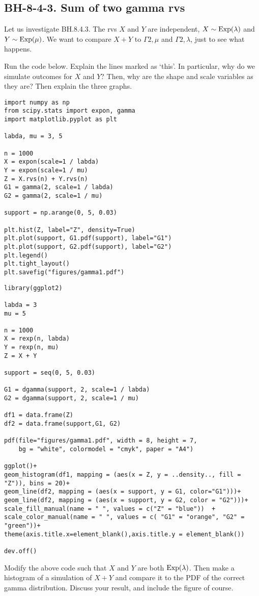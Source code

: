 \subsection{BH-8-4-3. Sum of two gamma rvs}
\label{sec:sum-two-gamma}

Let us investigate BH.8.4.3. The rvs $X$ and $Y$ are independent, $X\sim\mathrm{Exp}(\lambda)$ and $Y\sim\mathrm{Exp}(\mu)$. We want to compare $X+Y$ to $\Gamma{2, \mu}$ and $\Gamma{2, \lambda}$, just to see what happens.

\begin{exercise}
Run the  code below. Explain the lines marked as `this'. In particular, why do we simulate outcomes for $X$ and $Y$? Then, why are the shape and scale variables as they are? Then explain the three graphs.
\begin{verbatim}
import numpy as np
from scipy.stats import expon, gamma
import matplotlib.pyplot as plt

labda, mu = 3, 5

n = 1000
X = expon(scale=1 / labda)
Y = expon(scale=1 / mu)
Z = X.rvs(n) + Y.rvs(n)
G1 = gamma(2, scale=1 / labda)
G2 = gamma(2, scale=1 / mu)

support = np.arange(0, 5, 0.03)

plt.hist(Z, label="Z", density=True)
plt.plot(support, G1.pdf(support), label="G1")
plt.plot(support, G2.pdf(support), label="G2")
plt.legend()
plt.tight_layout()
plt.savefig("figures/gamma1.pdf")
\end{verbatim}

\begin{verbatim}
library(ggplot2)

labda = 3
mu = 5

n = 1000
X = rexp(n, labda)
Y = rexp(n, mu)
Z = X + Y

support = seq(0, 5, 0.03)

G1 = dgamma(support, 2, scale=1 / labda)
G2 = dgamma(support, 2, scale=1 / mu)

df1 = data.frame(Z)
df2 = data.frame(support,G1, G2)

pdf(file="figures/gamma1.pdf", width = 8, height = 7, 
    bg = "white", colormodel = "cmyk", paper = "A4")   

ggplot()+
geom_histogram(df1, mapping = (aes(x = Z, y = ..density.., fill = "Z")), bins = 20)+
geom_line(df2, mapping = (aes(x = support, y = G1, color="G1")))+
geom_line(df2, mapping = (aes(x = support, y = G2, color = "G2")))+
scale_fill_manual(name = " ", values = c("Z" = "blue"))  +
scale_color_manual(name = " ", values = c( "G1" = "orange", "G2" = "green"))+
theme(axis.title.x=element_blank(),axis.title.y = element_blank())

dev.off()
\end{verbatim}
\end{exercise}

\begin{exercise}
Modify the above code such that $X$ and $Y$ are both $\mathrm{Exp}(\lambda)$. Then make a histogram of a simulation of $X+Y$ and compare it to the PDF of the correct gamma  distribution. Discuss your result, and include the figure of course.
\end{exercise}
